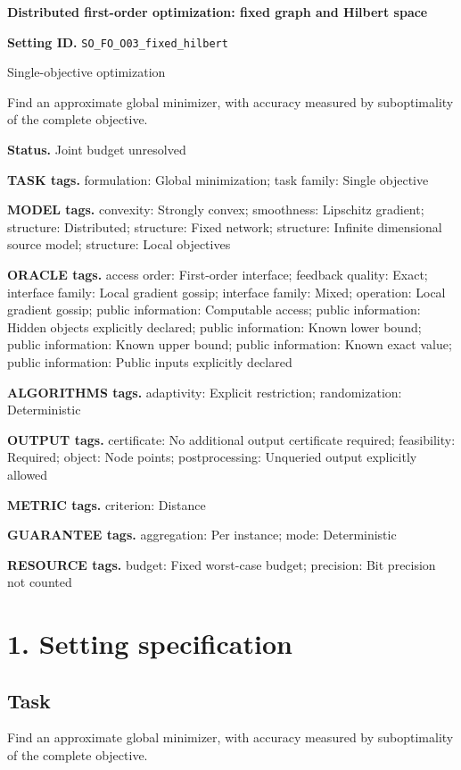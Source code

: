 \documentclass[10pt,a4paper]{article}
\begin{document}
\raggedright

{\LARGE\bfseries\sffamily\color{AtlasNavy} Distributed first-order optimization: fixed graph and Hilbert space\par}\vspace{5pt}
\textbf{Setting ID.} \texttt{SO\_\allowbreak{}FO\_\allowbreak{}O03\_\allowbreak{}fixed\_\allowbreak{}hilbert}

Single-objective optimization

Find an approximate global minimizer, with accuracy measured by suboptimality of the complete objective.

\textbf{Status.} Joint budget unresolved

\textbf{TASK tags.} formulation: Global minimization; task family: Single objective

\textbf{MODEL tags.} convexity: Strongly convex; smoothness: Lipschitz gradient; structure: Distributed; structure: Fixed network; structure: Infinite dimensional source model; structure: Local objectives

\textbf{ORACLE tags.} access order: First-order interface; feedback quality: Exact; interface family: Local gradient gossip; interface family: Mixed; operation: Local gradient gossip; public information: Computable access; public information: Hidden objects explicitly declared; public information: Known lower bound; public information: Known upper bound; public information: Known exact value; public information: Public inputs explicitly declared

\textbf{ALGORITHMS tags.} adaptivity: Explicit restriction; randomization: Deterministic

\textbf{OUTPUT tags.} certificate: No additional output certificate required; feasibility: Required; object: Node points; postprocessing: Unqueried output explicitly allowed

\textbf{METRIC tags.} criterion: Distance

\textbf{GUARANTEE tags.} aggregation: Per instance; mode: Deterministic

\textbf{RESOURCE tags.} budget: Fixed worst-case budget; precision: Bit precision not counted

\section{1. Setting specification}
\subsection{Task}
Find an approximate global minimizer, with accuracy measured by suboptimality of the complete objective.
\end{document}
